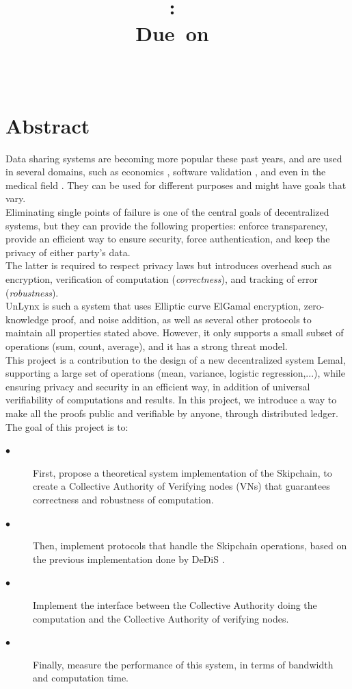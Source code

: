 \documentclass{article}
\title{
\logoepfl
\vspace{2in}
\textmd{\textbf{\hmwkClass:\ \hmwkTitle}}\\
\normalsize\vspace{0.1in}\small{Due\ on\ \hmwkDueDate}\\
\vspace{0.1in}\large{\textit{\hmwkClassInstructor\ \hmwkClassTime}}
\author{\textbf{\hmwkAuthorName}}
\vspace{3in}
}
\begin{document}
\maketitle

\newpage
\section*{Abstract}
Data sharing systems are becoming more popular these past years, and are used in several domains, such as economics \cite{bitcoin}, software validation \cite{chainiac}, and even in the medical field \cite{health}. They can be used for different purposes and might have goals that vary.\\
Eliminating single points of failure is one of the central goals of decentralized systems,  but they can provide the following properties: enforce transparency, provide an efficient way to ensure security, force authentication, and keep the privacy of either party's data.\\
The latter is required to respect privacy laws but introduces overhead such as encryption, verification of computation (\textit{correctness}), and tracking of error (\textit{robustness}).\\
UnLynx \cite{unlynx} is such a system that uses Elliptic curve ElGamal encryption, zero-knowledge proof, and noise addition, as well as several other protocols to maintain all properties stated above. However, it only supports a small subset of operations (sum, count, average), and it has a strong threat model.\\
This project is a contribution to the design of a new decentralized system Lemal, supporting a large set of operations (mean, variance, logistic regression,...), while ensuring privacy and security in an efficient way, in addition of universal verifiability of computations and results.
In this project, we introduce a way to make all the proofs public and verifiable by anyone, through distributed ledger.
The goal of this project is to:
\begin{description}
\item[$\bullet$] First, propose a theoretical system implementation of the Skipchain, to create a Collective Authority of Verifying nodes (VNs) that guarantees correctness and robustness of computation.
\item[$\bullet$] Then, implement protocols that handle the Skipchain operations, based on the previous implementation done by DeDiS \cite{dedis}.
\item[$\bullet$] Implement the interface between the Collective Authority doing the computation and the Collective Authority of verifying nodes.
\item[$\bullet$] Finally, measure the performance of this system, in terms of bandwidth and computation time.
\end{description}
\end{document}
